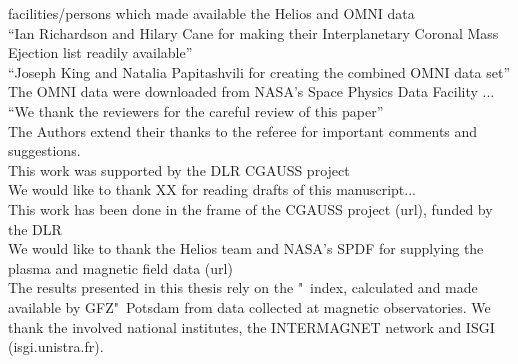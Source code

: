 facilities/persons which made available the Helios and OMNI data\\
``Ian Richardson and Hilary Cane for making their Interplanetary Coronal Mass Ejection list readily available''\\
``Joseph King and Natalia Papitashvili for creating the combined OMNI data set''\\
The OMNI data were downloaded from NASA's Space Physics Data Facility ...\\
``We thank the reviewers for the careful review of this paper''\\
The Authors extend their thanks to the referee for important comments and suggestions.\\
This work was supported by the DLR CGAUSS project\\
We would like to thank XX for reading drafts of this manuscript...\\
This work has been done in the frame of the CGAUSS project (url), funded by the DLR\\
We would like to thank the Helios team and NASA's SPDF for supplying the plasma and magnetic field data (url)\\


The results presented in this thesis rely on the \Kp{}"~index, calculated and made available by GFZ"~Potsdam from data collected at magnetic observatories. We thank the involved national institutes, the INTERMAGNET network and ISGI (isgi.unistra.fr).\\
